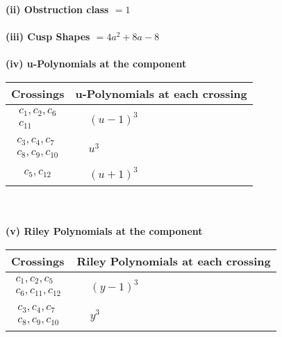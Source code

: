 \documentclass[1p]{elsarticle_modified}
\theoremstyle{definition}
\begin{document}
\flushleft \textbf{(ii) Obstruction class $= 1$}\\~\\
\flushleft \textbf{(iii) Cusp Shapes $= 4 a^2+8 a-8$}\\~\\
\newpage\renewcommand{\arraystretch}{1}
\flushleft \textbf{(iv) u-Polynomials at the component}\newline \\
\begin{tabular}{m{50pt}|m{274pt}}
Crossings & \hspace{64pt}u-Polynomials at each crossing \\
\hline $$\begin{aligned}c_{1},c_{2},c_{6}\\c_{11}\end{aligned}$$&$\begin{aligned}
&(u-1)^3
\end{aligned}$\\
\hline $$\begin{aligned}c_{3},c_{4},c_{7}\\c_{8},c_{9},c_{10}\end{aligned}$$&$\begin{aligned}
&u^3
\end{aligned}$\\
\hline $$\begin{aligned}c_{5},c_{12}\end{aligned}$$&$\begin{aligned}
&(u+1)^3
\end{aligned}$\\
\hline
\end{tabular}\\~\\
\newpage\renewcommand{\arraystretch}{1}
\flushleft \textbf{(v) Riley Polynomials at the component}\newline \\
\begin{tabular}{m{50pt}|m{274pt}}
Crossings & \hspace{64pt}Riley Polynomials at each crossing \\
\hline $$\begin{aligned}c_{1},c_{2},c_{5}\\c_{6},c_{11},c_{12}\end{aligned}$$&$\begin{aligned}
&(y-1)^3
\end{aligned}$\\
\hline $$\begin{aligned}c_{3},c_{4},c_{7}\\c_{8},c_{9},c_{10}\end{aligned}$$&$\begin{aligned}
&y^3
\end{aligned}$\\
\hline
\end{tabular}\\~\\
\end{document}
